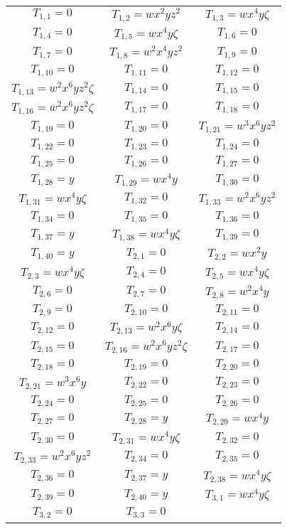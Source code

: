 \documentclass[12pt]{memoireuqam1.3}
\begin{document}
\begin{longtable}{|c|c|c|} 
\hline
$T_{1,1}= 0$&
$T_{1,2}= wx^2yz^2$&
$T_{1,3}= wx^4y\zeta$\\
$T_{1,4}= 0$&
$T_{1,5}= wx^4y\zeta$&
$T_{1,6}= 0$\\
$T_{1,7}= 0$&
$T_{1,8}= w^2x^4yz^2$&
$T_{1,9}= 0$\\
$T_{1,10}= 0$&
$T_{1,11}= 0$&
$T_{1,12}= 0$\\
$T_{1,13}= w^2x^6yz^2\zeta$&
$T_{1,14}= 0$&
$T_{1,15}= 0$\\
$T_{1,16}= w^2x^6yz^2\zeta$&
$T_{1,17}= 0$&
$T_{1,18}= 0$\\
$T_{1,19}= 0$&
$T_{1,20}= 0$&
$T_{1,21}= w^3x^6yz^2$\\
$T_{1,22}= 0$&
$T_{1,23}= 0$&
$T_{1,24}= 0$\\
$T_{1,25}= 0$&
$T_{1,26}= 0$&
$T_{1,27}= 0$\\
$T_{1,28}= y$&
$T_{1,29}= wx^4y$&
$T_{1,30}= 0$\\
$T_{1,31}= wx^4y\zeta$&
$T_{1,32}= 0$&
$T_{1,33}= w^2x^6yz^2$\\
$T_{1,34}= 0$&
$T_{1,35}= 0$&
$T_{1,36}= 0$\\
$T_{1,37}= y$&
$T_{1,38}= wx^4y\zeta$&
$T_{1,39}= 0$\\
$T_{1,40}= y$&
$T_{2,1}= 0$&
$T_{2,2}= wx^2y$\\
$T_{2,3}= wx^4y\zeta$&
$T_{2,4}= 0$&
$T_{2,5}= wx^4y\zeta$\\
$T_{2,6}= 0$&
$T_{2,7}= 0$&
$T_{2,8}= w^2x^4y$\\
$T_{2,9}= 0$&
$T_{2,10}= 0$&
$T_{2,11}= 0$\\
$T_{2,12}= 0$&
$T_{2,13}= w^2x^6y\zeta$&
$T_{2,14}= 0$\\
$T_{2,15}= 0$&
$T_{2,16}= w^2x^6yz^2\zeta$&
$T_{2,17}= 0$\\
$T_{2,18}= 0$&
$T_{2,19}= 0$&
$T_{2,20}= 0$\\
$T_{2,21}= w^3x^6y$&
$T_{2,22}= 0$&
$T_{2,23}= 0$\\
$T_{2,24}= 0$&
$T_{2,25}= 0$&
$T_{2,26}= 0$\\
$T_{2,27}= 0$&
$T_{2,28}= y$&
$T_{2,29}= wx^4y$\\
$T_{2,30}= 0$&
$T_{2,31}= wx^4y\zeta$&
$T_{2,32}= 0$\\
$T_{2,33}= w^2x^6yz^2$&
$T_{2,34}= 0$&
$T_{2,35}= 0$\\
$T_{2,36}= 0$&
$T_{2,37}= y$&
$T_{2,38}= wx^4y\zeta$\\
$T_{2,39}= 0$&
$T_{2,40}= y$&
$T_{3,1}= wx^4y\zeta$\\
$T_{3,2}= 0$&
$T_{3,3}= 0$&

\end{longtable}
\end{document}
